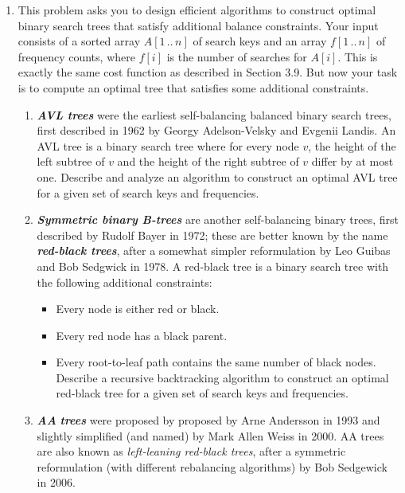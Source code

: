 \begin{enumerate}[label=\arabic*.,ref=\thechapter.\arabic*,leftmargin=*,align=left,widest*=99,itemsep=1.5ex plus 0.5ex,resume]
These prices depend on customer demand, and people who buy marble counter tops are weird, so don’t make any assumptions about them; in particular, larger rectangles may have significantly smaller spot prices.
Given the array of spot prices and the integers $m$ and $n$ as input, describe an algorithm to compute how to subdivide an $n\times m$ marble slab to maximize your profit.
\item This problem asks you to design efficient algorithms to construct optimal binary search trees that satisfy additional balance constraints.
Your input consists of a sorted array $A[1\,..\,n]$ of search keys and an array $f[1\,..\,n]$ of frequency counts, where $f[i]$ is the number of searches for $A[i]$.
This is exactly the same cost function as described in Section 3.9.
But now your task is to compute an optimal tree that satisfies some additional constraints.
\begin{enumerate}
\item \textbf{\textit{AVL trees}} were the earliest self-balancing balanced binary search trees, first described in 1962 by Georgy Adelson-Velsky and Evgenii Landis.
An AVL tree is a binary search tree where for every node $v$, the height of the left subtree of $v$ and the height of the right subtree of $v$ differ by at most one.
Describe and analyze an algorithm to construct an optimal AVL tree for a given set of search keys and frequencies.
\item \textbf{\textit{Symmetric binary B-trees}} are another self-balancing binary trees, first described by Rudolf Bayer in 1972; these are better known by the name \textbf{\textit{red-black trees}}, after a somewhat simpler reformulation by Leo Guibas and Bob Sedgwick in 1978.
A red-black tree is a binary search tree with the following additional constraints:
\begin{itemize}
\item Every node is either red or black.
\item Every red node has a black parent.
\item Every root-to-leaf path contains the same number of black nodes.
Describe a recursive backtracking algorithm to construct an optimal red-black tree for a given set of search keys and frequencies.
\end{itemize}
\item \textbf{\textit{AA}} \textbf{\textit{trees}} were proposed by proposed by Arne Andersson in 1993 and slightly simplified (and named) by Mark Allen Weiss in 2000.
AA trees are also known as \textit{left-leaning red-black trees}, after a symmetric reformulation (with different rebalancing algorithms) by Bob Sedgewick in 2006.

\end{enumerate}
\end{enumerate}
